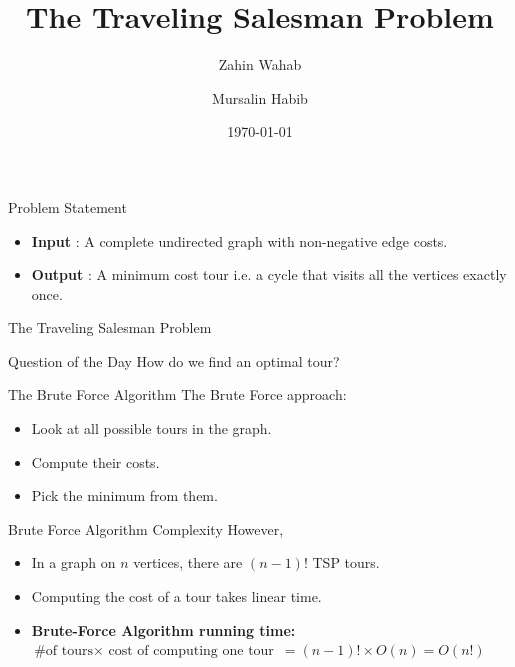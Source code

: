 \documentclass{beamer}
\title{The Traveling Salesman Problem}
\author{Zahin Wahab \and Mursalin Habib}
\institute[BUET] %
{
  
  Department of Computer Science \& Engineering\\
  Bangladesh University of Engineering and Technology
}
\date{\today}
\begin{document}
\begin{frame}
  \titlepage
\end{frame}




\begin{frame}{Problem Statement}

    \begin{itemize}
        \item<1-> \textbf{Input} : A complete undirected graph with non-negative edge costs.
    
        \item<2-> \textbf{Output} : A minimum cost tour i.e. a cycle that visits all the vertices exactly once.
    
    \end{itemize} 
\end{frame}









\begin{frame}{\centering The Traveling Salesman Problem}
\begin{block}{Question of the Day} \vspace{3mm}
\centering How do we find an optimal tour?\newline
\end{block}
\end{frame}

\begin{frame}{The Brute Force Algorithm}
The Brute Force approach:
    \begin{itemize}
    \item<2-> Look at all possible tours in the graph. 
 \item<3-> Compute their costs.
 \item<4-> Pick the minimum from them.
    \end{itemize} 
\end{frame}


\begin{frame}{Brute Force Algorithm Complexity}
However,
    \begin{itemize}
    \item<2-> In a graph on $n$ vertices, there are $(n-1)!$ TSP tours.
 \item<3-> Computing the cost of a tour takes linear time.
 \item<4->\textbf{Brute-Force Algorithm running time:} $\text{\# of tours} \times \text{ cost of computing one tour}$
 $= (n-1)! \times O(n)
 =O(n!)$
    \end{itemize} 
\end{frame}
\end{document}
